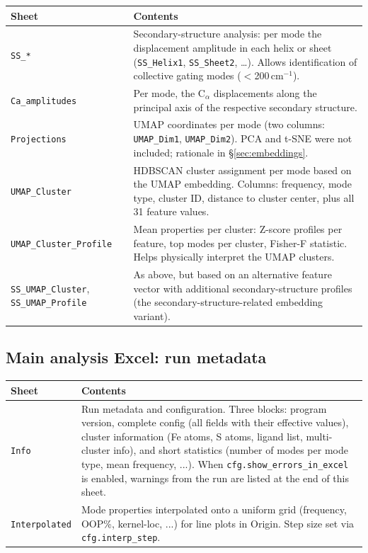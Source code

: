 \documentclass[11pt,a4paper,twoside]{article}
\theoremstyle{remark}
\begin{document}
\begin{longtable}{p{} p{}}
\toprule
\textbf{Sheet} & \textbf{Contents} \\
\midrule
\endhead

\texttt{SS\_*} & Secondary-structure analysis: per mode the
  displacement amplitude in each helix or sheet
  (\texttt{SS\_Helix1}, \texttt{SS\_Sheet2}, \ldots). Allows
  identification of collective gating modes ($<$200\,cm$^{-1}$). \\

\texttt{Ca\_amplitudes} & Per mode, the C$_\alpha$ displacements
  along the principal axis of the respective secondary structure. \\

\texttt{Projections} & UMAP coordinates per mode (two columns:
  \texttt{UMAP\_Dim1}, \texttt{UMAP\_Dim2}). PCA and t-SNE were
  not included; rationale in \S\ref{sec:embeddings}. \\

\texttt{UMAP\_Cluster} & HDBSCAN cluster assignment per mode
  based on the UMAP embedding. Columns: frequency, mode type,
  cluster ID, distance to cluster center, plus all 31 feature
  values. \\

\texttt{UMAP\_Cluster\_Profile} & Mean properties per cluster:
  Z-score profiles per feature, top modes per cluster,
  Fisher-F statistic. Helps physically interpret the UMAP
  clusters. \\

\texttt{SS\_UMAP\_Cluster}, \texttt{SS\_UMAP\_Profile} & As above,
  but based on an alternative feature vector with additional
  secondary-structure profiles (the secondary-structure-related
  embedding variant). \\
\bottomrule
\end{longtable}

\subsection{Main analysis Excel: run metadata}

\begin{longtable}{p{} p{}}
\toprule
\textbf{Sheet} & \textbf{Contents} \\
\midrule
\endhead

\texttt{Info} & Run metadata and configuration. Three blocks:
  program version, complete config (all fields with their
  effective values), cluster information (Fe atoms, S atoms,
  ligand list, multi-cluster info), and short statistics
  (number of modes per mode type, mean frequency, ...).
  When \texttt{cfg.show\_errors\_in\_excel} is enabled, warnings
  from the run are listed at the end of this sheet. \\

\texttt{Interpolated} & Mode properties interpolated onto a
  uniform grid (frequency, OOP\%, kernel-loc, ...) for line
  plots in Origin. Step size set via \texttt{cfg.interp\_step}. \\
\bottomrule
\end{longtable}
\end{document}
